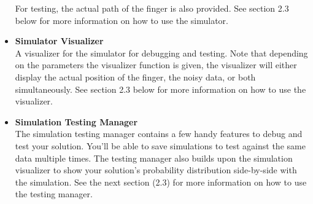 \documentclass{article}
\begin{document}
\begin{itemize}
    For testing, the actual path of the finger is also provided. See section 2.3 below for more information on how to use the simulator.
    \item \textbf{Simulator Visualizer}\\
    A visualizer for the simulator for debugging and testing. Note that depending on the parameters the visualizer function is given, the visualizer will either display the actual position of the finger, the noisy data, or both simultaneously. See section 2.3 below for more information on how to use the visualizer.
    \item \textbf{Simulation Testing Manager}\\
    The simulation testing manager contains a few handy features to debug and test your solution. You'll be able to save simulations to test against the same data multiple times. The testing manager also builds upon the simulation visualizer to show your solution's probability distribution side-by-side with the simulation. See the next section (2.3) for more information on how to use the testing manager.
\end{itemize}
\end{document}
